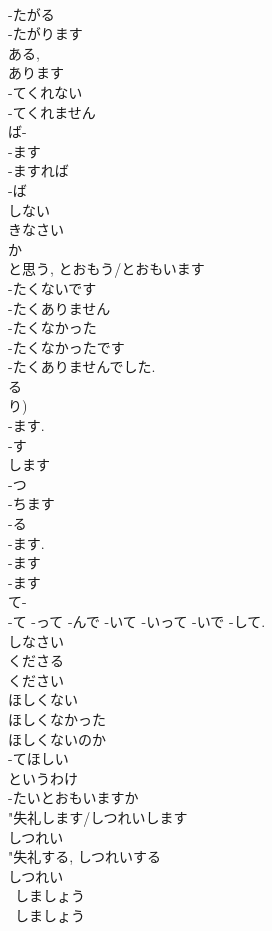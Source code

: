 \documentclass[8pt]{extreport}
\begin{document}
\begin{CJK}{UTF8}{min}
\\	-たがる 
\\	-たがります		
\\	ある, 
\\	あります	
\\	-てくれない 
\\	-てくれません	
\\	ば-
\\	-ます 
\\	-ますれば	
\\	-ば 
\\	しない		
\\	きなさい	
\\	か 
\\	と思う, とおもう/とおもいます 
\\	-たくないです 
\\	-たくありません		
\\	-たくなかった		
\\	-たくなかったです 
\\	-たくありませんでした.		
\\	る 
\\	り) 
\\	-ます. 
\\	-す 
\\	します 
\\	-つ 
\\	-ちます	
\\	-る 
\\	-ます.	
\\	-ます 
\\	-ます 
\\	て-
\\	-て -って -んで -いて -いって -いで -して.
\\	しなさい	
\\	くださる 
\\	ください		
\\	ほしくない		
\\	ほしくなかった		
\\	ほしくないのか		
\\	-てほしい		
\\	というわけ		
\\	-たいとおもいますか		
\\	"失礼します/しつれいします 
\\	しつれい 
\\	"失礼する, しつれいする 
\\	しつれい 
\\	~しましょう	
\\	~しましょう 

\end{CJK}
\end{document}
